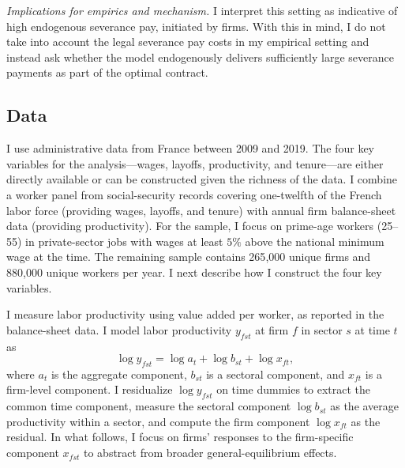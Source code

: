 \emph{Implications for empirics and mechanism.} I interpret this setting as indicative of high endogenous severance pay, initiated by firms. With this in mind, I do not take into account the legal severance pay costs in my empirical setting and instead ask whether the model endogenously delivers sufficiently large severance payments as part of the optimal contract.


\subsection{Data}
I use administrative data from France between 2009 and 2019. The four key variables for the analysis—wages, layoffs, productivity, and tenure—are either directly available or can be constructed given the richness of the data. I combine a worker panel from social-security records covering one-twelfth of the French labor force (providing wages, layoffs, and tenure) with annual firm balance-sheet data (providing productivity). For the sample, I focus on prime-age workers (25–55) in private-sector jobs with wages at least $5\%$ above the national minimum wage at the time. The remaining sample contains 265{,}000 unique firms and 880{,}000 unique workers per year. I next describe how I construct the four key variables.

I measure labor productivity using value added per worker, as reported in the balance-sheet data. I model labor productivity $y_{fst}$ at firm $f$ in sector $s$ at time $t$ as
\[
\log y_{fst} = \log a_t + \log b_{st} + \log x_{ft},
\]
where $a_t$ is the aggregate component, $b_{st}$ is a sectoral component, and $x_{ft}$ is a firm-level component. I residualize $\log y_{fst}$ on time dummies to extract the common time component, measure the sectoral component $\log b_{st}$ as the average productivity within a sector, and compute the firm component $\log x_{ft}$ as the residual. In what follows, I focus on firms’ responses to the firm-specific component $x_{fst}$ to abstract from broader general-equilibrium effects.


